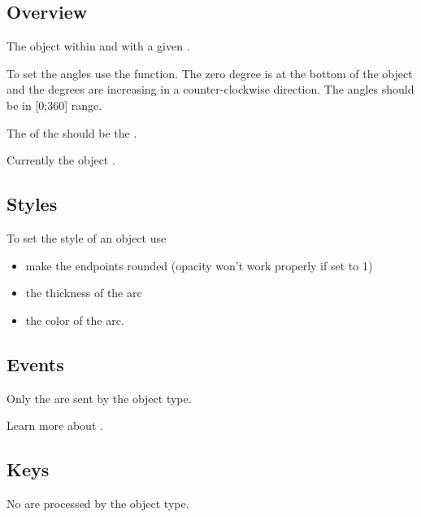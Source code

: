 \documentclass[letterpaper,10pt,english]{sphinxmanual}
\begin{document}
\subsection{Overview}
\label{\detokenize{object-types/arc:overview}}
The  object  within  and with a given .

To set the angles use the  function. The zero degree is at the bottom of the object and the degrees are increasing in a counter-clockwise direction.
The angles should be in {[}0;360{]} range.

The  of the  should be the .

Currently the  object .


\subsection{Styles}
\label{\detokenize{object-types/arc:styles}}
To set the style of an  object use 
\begin{itemize}
\item {} 
 make the endpoints rounded (opacity won’t work properly if set to 1)

\item {} 
 the thickness of the arc

\item {} 
 the color of the arc.

\end{itemize}


\subsection{Events}
\label{\detokenize{object-types/arc:events}}
Only the  are sent by the object type.

Learn more about {\hyperref[\detokenize{overview/events::doc}]{}}.


\subsection{Keys}
\label{\detokenize{object-types/arc:keys}}
No  are processed by the object type.
\end{document}
